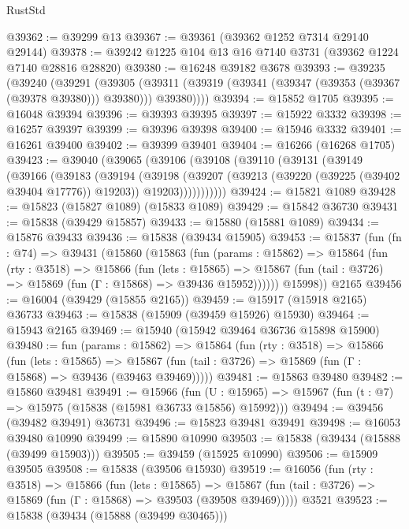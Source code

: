 \begin{lexlean}{RustStd}
\begin{coremodule}
@39362 := @39299 @13
@39367 := @39361 (@39362 @1252 @7314 @29140 @29144)
@39378 := @39242 @1225 @104 @13 @16 @7140 @3731 (@39362 @1224 @7140 @28816 @28820)
@39380 := @16248 @39182 @3678
@39393 := @39235
    (@39240
      (@39291
        (@39305
          (@39311 (@39319 (@39341 (@39347 (@39353 (@39367 (@39378 @39380))) @39380))) @39380))))
@39394 := @15852 @1705
@39395 := @16048 @39394
@39396 := @39393 @39395
@39397 := @15922 @3332
@39398 := @16257 @39397
@39399 := @39396 @39398
@39400 := @15946 @3332
@39401 := @16261 @39400
@39402 := @39399 @39401
@39404 := @16266 (@16268 @1705)
@39423 := @39040
    (@39065
      (@39106
        (@39108
          (@39110
            (@39131
              (@39149
                (@39166
                  (@39183
                    (@39194
                      (@39198
                        (@39207
                          (@39213 (@39220 (@39225 (@39402 @39404 @17776)) @19203))
                          @19203)))))))))))
@39424 := @15821 @1089
@39428 := @15823 (@15827 @1089) (@15833 @1089)
@39429 := @15842 @36730
@39431 := @15838 (@39429 @15857)
@39433 := @15880 (@15881 @1089)
@39434 := @15876 @39433
@39436 := @15838 (@39434 @15905)
@39453 := @15837
    (fun (fn : @74) =>
    @39431
      (@15860
        (@15863
          (fun (params : @15862) =>
          @15864
            (fun (rty : @3518) =>
            @15866
              (fun (lets : @15865) =>
              @15867 (fun (tail : @3726) => @15869 (fun (Γ : @15868) => @39436 @15952))))))
        @15998))
    @2165
@39456 := @16004 (@39429 (@15855 @2165))
@39459 := @15917 (@15918 @2165) @36733
@39463 := @15838 (@15909 (@39459 @15926) @15930)
@39464 := @15943 @2165
@39469 := @15940 (@15942 @39464 @36736 @15898 @15900)
@39480 := fun (params : @15862) =>
  @15864
    (fun (rty : @3518) =>
    @15866
      (fun (lets : @15865) =>
      @15867 (fun (tail : @3726) => @15869 (fun (Γ : @15868) => @39436 (@39463 @39469)))))
@39481 := @15863 @39480
@39482 := @15860 @39481
@39491 := @15966
    (fun (U : @15965) => @15967 (fun (t : @7) => @15975 (@15838 (@15981 @36733 @15856) @15992)))
@39494 := @39456 (@39482 @39491) @36731
@39496 := @15823 @39481 @39491
@39498 := @16053 @39480 @10990
@39499 := @15890 @10990
@39503 := @15838 (@39434 (@15888 (@39499 @15903)))
@39505 := @39459 (@15925 @10990)
@39506 := @15909 @39505
@39508 := @15838 (@39506 @15930)
@39519 := @16056
    (fun (rty : @3518) =>
    @15866
      (fun (lets : @15865) =>
      @15867 (fun (tail : @3726) => @15869 (fun (Γ : @15868) => @39503 (@39508 @39469)))))
    @3521
@39523 := @15838 (@39434 (@15888 (@39499 @30465)))

\end{coremodule}
\end{lexlean}
